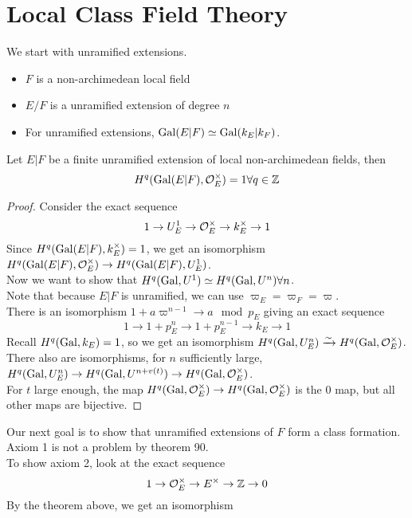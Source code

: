 \documentclass[../main.tex]{subfiles}
\begin{document}
\section{Local Class Field Theory}
We start with unramified extensions.\\
\begin{itemize}
\item $F$ is a non-archimedean local field
\item $E/F$ is a unramified extension of degree $n$ 
\item For unramified extensions, $\operatorname{Gal}( E |F) \simeq \operatorname{Gal}( k_E|k_F) $.
\end{itemize}
\begin{thm}
	Let $E |F$ be a  finite unramified extension of local non-archimedean fields, then
	\[ 
	H^{q}( \operatorname{Gal} ( E|F) , \mathcal{O}_E^{\times}) =1 \forall q \in \mathbb{Z}
	\]
	
\end{thm}
\begin{proof}
Consider the exact sequence
\[ 
1\to U_E^{1}\to \mathcal{O}_E^{\times}\to k_E^{\times}\to 1
\]
Since $H^{q}( \operatorname{Gal}( E|F) , k_E^{\times}) =1$, we get an isomorphism $H^{q}( \operatorname{Gal}( E|F) , \mathcal{O}_E^{\times}) \to H^{q}( \operatorname{Gal}( E|F) , U^{1}_E) $.\\
Now we want to show that $H^{q}( \operatorname{Gal},U^{1}) \simeq H^{q}( \operatorname{Gal}, U^{n}) \forall n$.\\
Note that because $E|F$ is unramified, we can use $\varpi_E= \varpi_F = \varpi$.\\
There is an isomorphism $1+ a \varpi^{n-1}\to a \mod p_E$ giving an exact sequence 
\[ 
1\to 1+ p_E^{n}\to 1+ p_E^{n-1}\to k_E\to 1
\]
Recall $H^{q}( \operatorname{Gal}, k_E) =1$, so we get an isomorphism $H^{q}( \operatorname{Gal}, U^{n}_E) \xrightarrow{\sim} H^{q}( \operatorname{Gal}, \mathcal{O}_E^{\times}) $.\\
There also are isomorphisms, for $n$ sufficiently large, $H^{q}( \operatorname{Gal}, U_E^{n}) \to H^{q}( \operatorname{Gal}, U^{n+v( t) }) \to H^{q}( \operatorname{Gal},\mathcal{O}_E^{\times})  $.\\
For $t$ large enough, the map $H^{q}( \operatorname{Gal}, \mathcal{O}_E^{\times}) \to H^{q}( \operatorname{Gal}, \mathcal{O}_E^{\times}) $ is the $0$ map, but all other maps are bijective.
\end{proof}
Our next goal is to show that unramified extensions of $F$ form a class formation.\\
Axiom 1 is not a  problem by theorem 90.\\
To show axiom 2, look at the exact sequence
\[ 
1\to \mathcal{O}_E^{\times}\to E^{\times}\to \mathbb{Z}\to 0
\]
By the theorem above, we get an isomorphism
\end{document}
